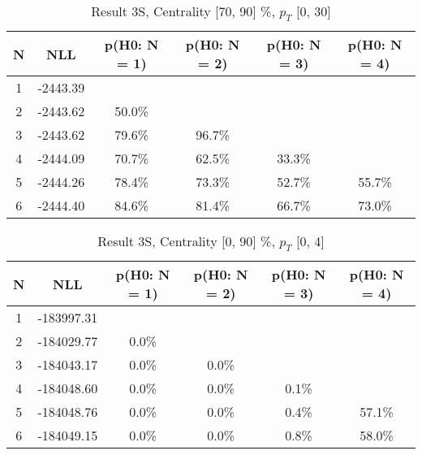 \begin{table}[htb]
	\begin{center}
	\caption{Result 3S, Centrality [70, 90] \%, $p_{T}$ [0, 30] \GeV
}
{\footnotesize\renewcommand{\arraystretch}{1.4}
		\begin{tabular}{cc||>{\columncolor[gray]{0.8}}cccc}
			N & NLL & p(H0: N = 1) & p(H0: N = 2) & p(H0: N = 3) & p(H0: N = 4)\\ 
		\hline
1 & -2443.39 & & & & \\
2 & -2443.62 & 50.0\% & & & \\
3 & -2443.62 & 79.6\% & 96.7\% & & \\
4 & -2444.09 & 70.7\% & 62.5\% & 33.3\% & \\
5 & -2444.26 & 78.4\% & 73.3\% & 52.7\% & 55.7\% \\
6 & -2444.40 & 84.6\% & 81.4\% & 66.7\% & 73.0\% \\
	\end{tabular}
		\label{tab:lab}
	}
	\end{center}\end{table}

\begin{table}[htb]
	\begin{center}
	\caption{Result 3S, Centrality [0, 90] \%, $p_{T}$ [0, 4] \GeV
}
{\footnotesize\renewcommand{\arraystretch}{1.4}
		\begin{tabular}{cc||ccc>{\columncolor[gray]{0.8}}c}
			N & NLL & p(H0: N = 1) & p(H0: N = 2) & p(H0: N = 3) & p(H0: N = 4)\\ 
		\hline
1 & -183997.31 & & & & \\
2 & -184029.77 & 0.0\% & & & \\
3 & -184043.17 & 0.0\% & 0.0\% & & \\
4 & -184048.60 & 0.0\% & 0.0\% & 0.1\% & \\
5 & -184048.76 & 0.0\% & 0.0\% & 0.4\% & 57.1\% \\
6 & -184049.15 & 0.0\% & 0.0\% & 0.8\% & 58.0\% \\
	\end{tabular}
		\label{tab:lab}
	}
	\end{center}\end{table}

